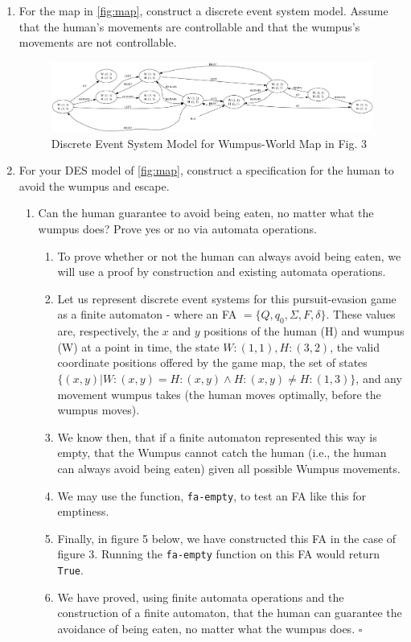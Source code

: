 \documentclass[12pt,letterpaper]{ntdhw}
\begin{document}
\begin{enumerate}

  \item For the map in \ref{fig:map}, construct a discrete event
  system model.  Assume that the human's movements are controllable
  and that the wumpus's movements are not controllable.

  \begin{figure}[ht]
      \centering
      \includegraphics[width=1.0\textwidth]{wumpus1.png}
      \caption{Discrete Event System Model for Wumpus-World Map in Fig. 3}
  \end{figure}

\clearpage

  \item For your DES model of \ref{fig:map}, construct a specification
  for the human to avoid the wumpus and escape.
  \begin{enumerate}
    \item Can the human guarantee to avoid being eaten, no matter what
    the wumpus does?  Prove yes or no via automata operations.

    \begin{enumerate}
        \item To prove whether or not the human can always avoid being eaten, we will use a proof by construction and existing automata operations.
        \item Let us represent discrete event systems for this pursuit-evasion game as a finite automaton - 
        where an FA $= \{Q, q_0, \Sigma, F, \delta\}$. These values are, respectively, the $x$ and $y$ positions of the human (H) and wumpus (W) at a point in time, the state $W:(1,1), H:(3,2)$, the valid coordinate positions offered by the game map, the set of states $\{(x,y) | W:(x,y) = H:(x,y) \wedge H:(x,y) \neq H:(1,3)\}$, and any movement wumpus takes (the human moves optimally, before the wumpus moves). 
        \item We know then, that if a finite automaton represented this way is empty, that the Wumpus cannot catch the human (i.e., the human can always avoid being eaten) given all possible Wumpus movements. 
        \item We may use the function, \texttt{fa-empty}, to test an FA like this for emptiness. 
        \item Finally, in figure 5 below, we have constructed this FA in the case of figure 3. Running the \texttt{fa-empty} function on this FA would return \texttt{True}. 
        \item We have proved, using finite automata operations and the construction of a finite automaton, that the human can guarantee the avoidance of being eaten, no matter what the wumpus does. $\square$
    \end{enumerate}


\end{enumerate}
\end{enumerate}
\end{document}
